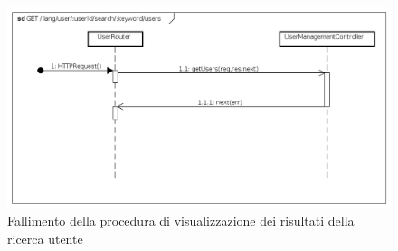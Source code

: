 \begin{itemize}
\begin{figure}[ht]
	\centering
	\includegraphics[scale=0.45]{UML/DiagrammiDiSequenza/Back-end/GET__lang_user__userId_search__keyword_users_failure.png}
	\caption{Fallimento della procedura di visualizzazione dei risultati della ricerca utente}
\end{figure}
\FloatBarrier

\end{itemize}

